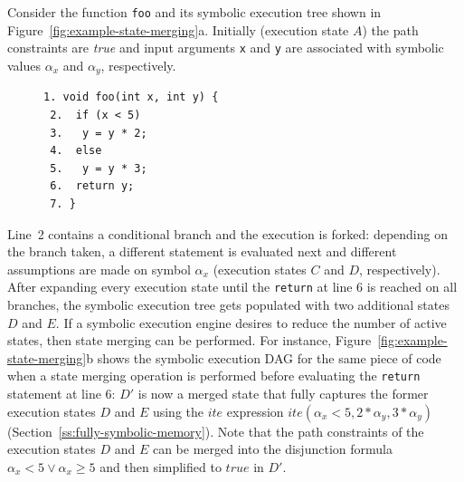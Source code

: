 \begin{shaded} Consider the function {\tt foo}  and its symbolic execution tree shown in Figure~\ref{fig:example-state-merging}a. Initially (execution state $A$) the path constraints are {\em true} and input arguments {\tt x} and {\tt y} are associated with symbolic values $\alpha_x$ and $\alpha_y$, respectively.
\begin{figure}
  \vspace{-4.2mm}
  \begin{lstlisting}[basicstyle=\ttfamily\small]
 1. void foo(int x, int y) {
 2.  if (x < 5)
 3.   y = y * 2;
 4.  else
 5.   y = y * 3;
 6.  return y;
 7. }
\end{lstlisting}
\vspace{-5.8mm}
\end{figure}
 Line~2 contains a conditional branch and the execution is forked: depending on the branch taken, a different statement is evaluated next and different assumptions are made on symbol $\alpha_x$ (execution states $C$ and $D$, respectively). After expanding every execution state until the {\tt return} at line 6 is reached on all branches, the symbolic execution tree gets populated with two additional states $D$ and $E$. If a symbolic execution engine desires to reduce the number of active states, then state merging can be performed. For instance, Figure~\ref{fig:example-state-merging}b shows the symbolic execution DAG for the same piece of code when a state merging operation is performed before evaluating the {\tt return} statement at line 6: $D'$ is now a merged state that fully captures the former execution states $D$ and $E$ using the $ite$ expression $ite(\alpha_x<5, 2*\alpha_y, 3*\alpha_y)$ (Section~\ref{ss:fully-symbolic-memory}). 
Note that the path constraints of the execution states $D$ and $E$ can be merged into the disjunction formula $\alpha_x < 5 \vee \alpha_x \geq 5$ and then simplified to $true$ in $D'$.
\end{shaded}

